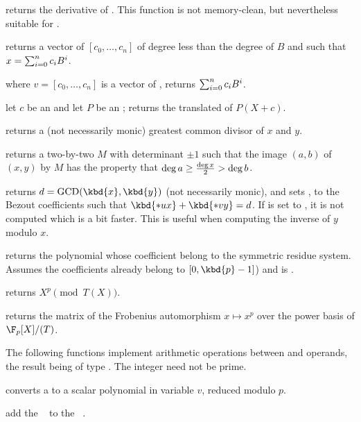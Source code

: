  returns the derivative of .
This function is not memory-clean, but nevertheless suitable for
.

 returns a vector of 
$[c_0,\ldots,c_n]$ of degree less than the degree of $B$ and such that
$x=\sum_{i=0}^{n}{c_i\*B^i}$.

 where $v=[c_0,\ldots,c_n]$
is a vector of , returns $\sum_{i=0}^{n}{c_i\*B^i}$.

 let $c$ be an  and let
$P$ be an ; returns the translated  of $P(X+c)$.

 returns a (not necessarily monic)
greatest common divisor of $x$  and $y$.

 returns a two-by-two 
$M$ with determinant $\pm 1$ such that the image $(a,b)$ of $(x,y)$ by $M$
has the property that $\deg a \geq {\deg x \over 2} > \deg b$.

 returns
$d = \text{GCD}(\kbd{x},\kbd{y})$ (not necessarily monic), and sets ,
 to the Bezout coefficients such that $\kbd{*ux} + \kbd{*vy} = d$.
If  is set to , it is not computed which is a bit faster.
This is useful when computing the inverse of $y$ modulo $x$.

 returns the polynomial whose
coefficient belong to the symmetric residue system. Assumes the coefficients
already belong to $[0,\kbd{p}-1]$) and  is .

 returns $X^{p}\pmod{T(X)}$.

 returns the matrix of the
Frobenius automorphism $x\mapsto x^p$ over the power basis of $\F_p[X]/(T)$.

The following functions implement arithmetic operations between 
and  operands, the result being of type . The integer
 need not be prime.

 converts a  to a scalar
polynomial in variable $v$, reduced modulo $p$.

 add the ~ to the
~.

